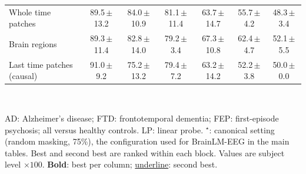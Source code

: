 \begin{table}[htbp]
{\begin{tabular}{l cc cc cc}
    Whole time patches & 89.5\,{\scriptsize$\pm$13.2} & 84.0\,{\scriptsize$\pm$10.9} & 81.1\,{\scriptsize$\pm$11.4} & 63.7\,{\scriptsize$\pm$14.7} & 55.7\,{\scriptsize$\pm$4.2} & 48.3\,{\scriptsize$\pm$3.4} \\
    Brain regions & 89.3\,{\scriptsize$\pm$11.4} & 82.8\,{\scriptsize$\pm$14.0} & 79.2\,{\scriptsize$\pm$3.4} & 67.3\,{\scriptsize$\pm$10.8} & 62.4\,{\scriptsize$\pm$4.7} & 52.1\,{\scriptsize$\pm$5.5} \\
    Last time patches (causal) & 91.0\,{\scriptsize$\pm$9.2} & 75.2\,{\scriptsize$\pm$13.2} & 79.4\,{\scriptsize$\pm$7.2} & 63.2\,{\scriptsize$\pm$14.2} & 52.2\,{\scriptsize$\pm$3.8} & 50.0\,{\scriptsize$\pm$0.0} \\
    \bottomrule
  \end{tabular}%
  }
  \\[3pt]
  \begin{minipage}{\linewidth}\footnotesize\raggedright
    AD: Alzheimer's disease; FTD: frontotemporal dementia; FEP: first-episode psychosis; all versus healthy controls. LP: linear probe. $^{\star}$: canonical setting (random masking, 75\%), the configuration used for BrainLM-EEG in the main tables. Best and second best are ranked within each block. Values are subject level $\times 100$. \textbf{Bold}: best per column; \underline{underline}: second best.
  \end{minipage}
\end{table}
